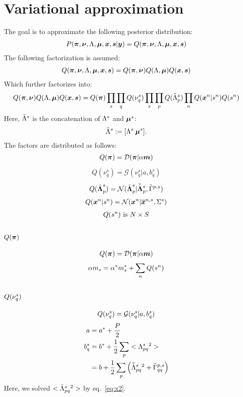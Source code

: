 \documentclass[a4paper]{article}
\begin{document}
\section{Variational approximation}
The goal is to approximate the following posterior distribution:
\begin{align}
  P(\boldsymbol{\pi},\boldsymbol{\nu},\Lambda,\boldsymbol{\mu},\boldsymbol{x},\boldsymbol{s}|\boldsymbol{y})=Q(\boldsymbol{\pi},\boldsymbol{\nu},\Lambda,\boldsymbol{\mu},\boldsymbol{x},\boldsymbol{s})
\end{align}
The following factorization is assumed:
\begin{align}
  Q(\boldsymbol{\pi},\boldsymbol{\nu},\Lambda,\boldsymbol{\mu},\boldsymbol{x},\boldsymbol{s})=Q(\boldsymbol{\pi},\boldsymbol{\nu})Q(\Lambda,\boldsymbol{\mu})Q(\boldsymbol{x},\boldsymbol{s})
\end{align}
Which further factorizes into:
\begin{align}
  Q(\boldsymbol{\pi},\boldsymbol{\nu})Q(\Lambda,\boldsymbol{\mu})Q(\boldsymbol{x},\boldsymbol{s})=Q(\boldsymbol{\pi})\prod_s\prod_q Q(\nu_q^s)\prod_s\prod_p Q(\tilde{\Lambda}^s_p) \prod_n Q(\boldsymbol{x}^n|s^n)Q(s^n)
\end{align}
Here, $\tilde{\Lambda}^s$ is the concatenation of $\Lambda^s$ and $\boldsymbol{\mu}^s$:
\begin{align}
  \tilde{\Lambda}^s:=[\Lambda^s \: \boldsymbol{\mu}^s].
\end{align}
The factors are distributed as follows:
\begin{align}
  Q(\boldsymbol{\pi})=\mathcal{D}(\boldsymbol{\pi}|\alpha\boldsymbol{m})
\end{align}
\begin{align}
 Q(\nu^s_q)=\mathcal{G}(\nu^s_q|a, b_q^s)
\end{align}
\begin{align}
  Q(\tilde{\boldsymbol{\Lambda}}^s_p)=\mathcal{N}(\tilde{\boldsymbol{\Lambda}}^s_p|\bar{\tilde{\boldsymbol{\Lambda}}}^s_p,\tilde{\Gamma}^{p,s})
\end{align}
\begin{align}
  Q(\boldsymbol{x}^n|s^n)=\mathcal{N}(\boldsymbol{x}^n|\overline{\boldsymbol{x}}^{n,s},\Sigma^s)
\end{align}
\begin{align}
  Q(s^n)\text{ is }N\times S
\end{align}

\subsection{$Q(\boldsymbol{\pi})$}
\begin{align}
  Q(\boldsymbol{\pi})=\mathcal{D}(\boldsymbol{\pi}|\alpha\boldsymbol{m})
\end{align}
\begin{align}
  \alpha m_s=\alpha^*m^*_s+\sum_n Q(s^n)
\end{align}

\subsection{$Q(\nu^s_q)$}
\begin{align}
 Q(\nu^s_q)=\mathcal{G}(\nu^s_q|a, b_q^s)
\end{align}
\begin{align}
a&=a^*+\frac{P}{2} \\
b_q^s&=b^*+\frac{1}{2}\sum_p<\Lambda^s_{pq}{}^2> \\
&=b+\frac{1}{2}\sum_p\left(\bar{\tilde{\Lambda}}^s_{pq}{}^2 + \tilde{\Gamma}^{p,s}_{qq}\right)
\end{align}
Here, we solved $<\tilde{\Lambda}^s_{pq}{}^2>$ by eq.~\ref{eq:x2}.
\end{document}
